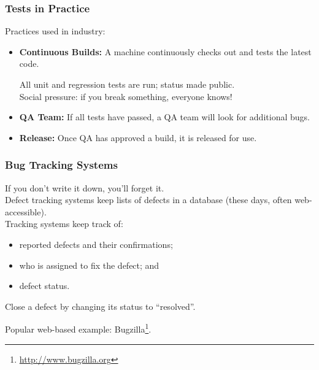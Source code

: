 \begin{frame}
\frametitle{Tests in Practice}

\begin{changemargin}{1cm}

Practices used in industry:

\begin{itemize}

\item \textbf{Continuous Builds:} A machine continuously checks out and tests the latest code.

All unit and regression tests are run; status made public. \\

Social pressure: if you break something, everyone knows!

\item \textbf{QA Team:} If all tests have passed, a QA team will look for additional bugs.

\item \textbf{Release:} Once QA has approved a build, it is released for use.
\end{itemize}
\end{changemargin}
\end{frame}

\begin{frame}
\frametitle{Bug Tracking Systems}

\begin{changemargin}{1cm}

If you don't write it down, you'll forget it. \\[1em]

Defect tracking systems
keep lists of defects in a database (these days, often
web-accessible).\\[1em]

Tracking systems keep track of:
\begin{itemize}
\item reported defects and
their confirmations; 
\item who is assigned to fix the defect; and 
\item defect
status.
\end{itemize} Close a defect
by changing its status to ``resolved''.

Popular web-based example: Bugzilla\footnote{\url{http://www.bugzilla.org}}.

\end{changemargin}

\end{frame}

